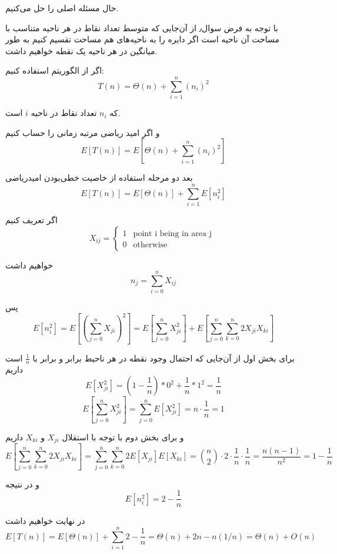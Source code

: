 حال مسئله اصلی را حل می‌کنیم.

با توجه به فرض سوال٫ از آن‌جایی که متوسط تعداد نقاط در هر ناحیه متناسب با مساحت آن ناحیه است
اگر دایره را به ناحیه‌های هم مساحت تقسیم کنیم به طور میانگین در هر ناحیه یک نقطه خواهیم داشت.

اگر از الگوریتم
استفاده کنیم:
\begin{equation}
	T(n) = \Theta(n) + \sum_{i=1}^n (n_i) ^ 2
\end{equation}

که 
$n_i$
تعداد نقاط در ناحیه 
$i$
است.

و اگر امید ریاضی مرتبه‌ زمانی را حساب کنیم
\begin{equation}
	E[T(n)] = E[\Theta(n) + \sum_{i=1}^n (n_i) ^ 2]
\end{equation}

بعد دو مرحله استفاده از خاصیت خطی‌بودن امیدریاضی
\begin{equation}
	E[T(n)] = E[\Theta(n)] + \sum_{i=1}^n E[n_i ^ 2]
\end{equation}

اگر تعریف کنیم
\begin{equation}
	X_{ij} = \begin{cases}
		1 & \mbox{
		point i being in area j
		} \\
		0 & \mbox{otherwise} 
	\end{cases}
\end{equation}

خواهیم داشت
\begin{equation}
	n_j = \sum_{i=0} ^n X_{ij} 
\end{equation}

پس
\begin{equation}
	E[n^2_i] = E[(\sum_{j=0} ^n X_{ji})^2] = E[\sum_{j=0} ^n X_{ji}^2] + E[\sum_{j=0} ^n \sum_{k=0} ^n 2 X_{ji} X_{ki}]
\end{equation}

برای بخش اول از آن‌جایی که احتمال وجود نقطه در هر ناحیط برابر و برابر با 
$\frac{1}{n}$
است داریم
\begin{equation}
	E[X^2_{ji}] = (1-\frac{1}{n}) * 0^2 + \frac{1}{n} * 1^2 = \frac{1}{n}
\end{equation}
\begin{equation}
	E[\sum_{j=0} ^n X_{ji}^2] = \sum_{j=0} ^n E[X_{ji}^2] = n \cdot \frac{1}{n} = 1
\end{equation}

و برای بخش دوم با توجه با استقلال
$X_{ji}$
و
$X_{ki}$
داریم
\begin{equation}
	E[\sum_{j=0} ^n \sum_{k=0} ^n 2 X_{ji} X_{ki}] = \sum_{j=0} ^n \sum_{k=0} ^n 2 E[X_{ji}] E[X_{ki}] = {n \choose 2} \cdot 2\cdot\frac{1}{n}\cdot \frac{1}{n} = \frac{n(n-1)}{n^2} = 1 - \frac{1}{n}
\end{equation}

و در نتیجه 
\begin{equation}
	E[n_i ^ 2] = 2 - \frac{1}{n}
\end{equation}

در نهایت خواهیم داشت
\begin{equation}
	E[T(n)] = E[\Theta(n)] + \sum_{i=1}^n 2 - \frac{1}{n} = 
	\Theta(n) + 2n - n(1/n) = \Theta(n) + O(n)
\end{equation}






